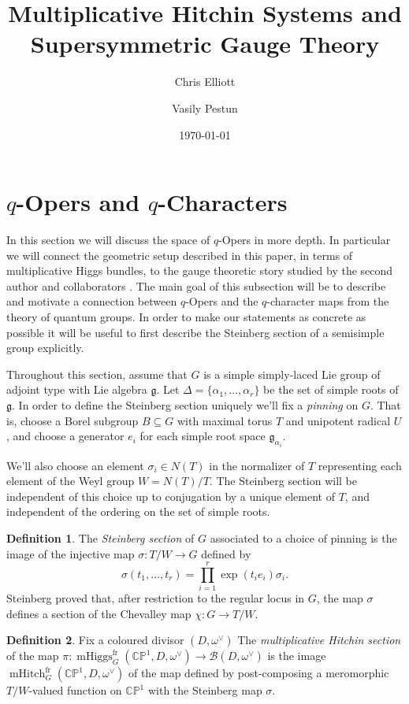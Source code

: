 \documentclass[11pt, oneside, reqno]{amsart}
\title{Multiplicative Hitchin Systems and Supersymmetric Gauge Theory}
\author{Chris Elliott \and Vasily Pestun}
\date{\today}
\theoremstyle{definition} \newtheorem{definition}{Definition}[section]
\theoremstyle{definition} \newtheorem{remark}[definition]{Remark}
\theoremstyle{definition} \newtheorem{remarks}[definition]{Remarks}
\theoremstyle{definition} \newtheorem{question}[definition]{Question}
\theoremstyle{definition} \newtheorem*{note}{Note}
\theoremstyle{definition} \newtheorem{example}[definition]{Example}
\theoremstyle{definition} \newtheorem{examples}[definition]{Examples}
\renewcommand{\gg}{\mathfrak{g}}
\newcommand{\bb}[1]{\mathbb{#1}}
\newcommand{\mc}[1]{\mathcal{#1}}
\newcommand{\sub}{\subseteq}
\DeclareMathOperator{\mhiggs}{mHiggs}
\DeclareMathOperator{\mhitch}{mHitch}
\newcommand{\fr}{\mathrm{fr}}
\begin{document}
 
\section{$q$-Opers and $q$-Characters}

In this section we will discuss the space of $q$-Opers in more depth.  In particular we will connect the geometric setup described in this paper, in terms of multiplicative Higgs bundles, to the gauge theoretic story studied by the second author and collaborators \cite{NekrasovPestunShatashvili,Kimura:2015rgi,Nekrasov:2015wsu}.  The main goal of this subsection will be to describe and motivate a connection between $q$-Opers and the $q$-character maps from the theory of quantum groups.  In order to make our statements as concrete as possible it will be useful to first describe the Steinberg section of a semisimple group explicitly.

Throughout this section, assume that $G$ is a simple simply-laced Lie group of adjoint type with Lie algebra $\gg$.  Let $\Delta = \{\alpha_1, \ldots, \alpha_r\}$ be the set of simple roots of $\gg$.  In order to define the Steinberg section uniquely we'll fix a \emph{pinning} on $G$.  That is, choose a Borel subgroup $B \sub G$ with maximal torus $T$ and unipotent radical $U$, and choose a generator $e_i$ for each simple root space $\gg_{\alpha_i}$.

We'll also choose an element $\sigma_i \in N(T)$ in the normalizer of $T$ representing each element of the Weyl group $W = N(T)/T$.  The Steinberg section will be independent of this choice up to conjugation by a unique element of $T$, and independent of the ordering on the set of simple roots.

\begin{definition}
The \emph{Steinberg section} of $G$ associated to a choice of pinning is the image of the injective map $\sigma \colon T/W \to G$ defined by
\[\sigma(t_1, \ldots, t_r) = \prod_{i=1}^r \exp(t_i e_i) \sigma_i.\]
Steinberg proved \cite[Theorem 1.4]{Steinberg} that, after restriction to the regular locus in $G$, the map $\sigma$ defines a section of the Chevalley map $\chi \colon G \to T/W$.
\end{definition}

\begin{definition}
Fix a coloured divisor $(D,\omega^\vee)$ The \emph{multiplicative Hitchin section} of the map $\pi \colon \mhiggs^\fr_G(\bb{CP}^1,D,\omega^\vee) \to \mc B(D,\omega^\vee)$ is the image $\mhitch^\fr_G(\bb{CP}^1, D, \omega^\vee)$ of the map defined by post-composing a meromorphic $T/W$-valued function on $\bb{CP}^1$ with the Steinberg map $\sigma$.
\end{definition}
\end{document}
